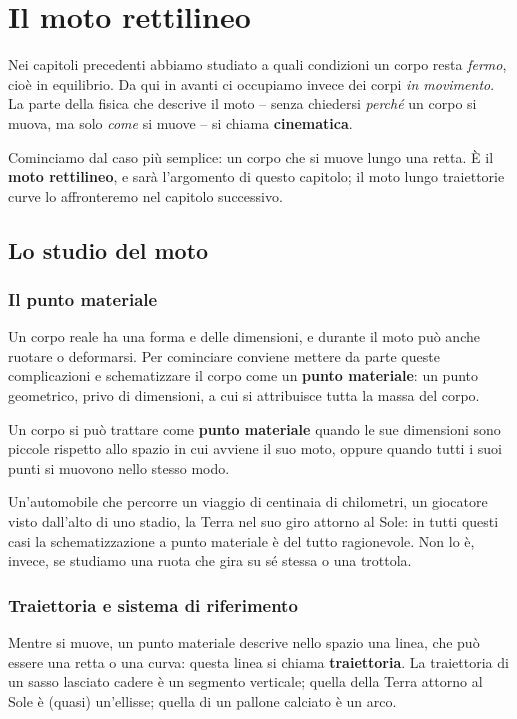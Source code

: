 \chapter{Il moto rettilineo}

Nei capitoli precedenti abbiamo studiato a quali condizioni un corpo resta \textit{fermo}, cioè in equilibrio. Da qui in avanti ci occupiamo invece dei corpi \textit{in movimento}. La parte della fisica che descrive il moto -- senza chiedersi \emph{perché} un corpo si muova, ma solo \emph{come} si muove -- si chiama \textbf{cinematica}.

Cominciamo dal caso più semplice: un corpo che si muove lungo una retta. È il \textbf{moto rettilineo}, e sarà l'argomento di questo capitolo; il moto lungo traiettorie curve lo affronteremo nel capitolo successivo.

\section{Lo studio del moto}

\subsection{Il punto materiale}
Un corpo reale ha una forma e delle dimensioni, e durante il moto può anche ruotare o deformarsi. Per cominciare conviene mettere da parte queste complicazioni e schematizzare il corpo come un \textbf{punto materiale}: un punto geometrico, privo di dimensioni, a cui si attribuisce tutta la massa del corpo.

\begin{definizione}
Un corpo si può trattare come \textbf{punto materiale} quando le sue dimensioni sono piccole rispetto allo spazio in cui avviene il suo moto, oppure quando tutti i suoi punti si muovono nello stesso modo.
\end{definizione}

Un'automobile che percorre un viaggio di centinaia di chilometri, un giocatore visto dall'alto di uno stadio, la Terra nel suo giro attorno al Sole: in tutti questi casi la schematizzazione a punto materiale è del tutto ragionevole. Non lo è, invece, se studiamo una ruota che gira su sé stessa o una trottola.

\subsection{Traiettoria e sistema di riferimento}
Mentre si muove, un punto materiale descrive nello spazio una linea, che può essere una retta o una curva: questa linea si chiama \textbf{traiettoria}. La traiettoria di un sasso lasciato cadere è un segmento verticale; quella della Terra attorno al Sole è (quasi) un'ellisse; quella di un pallone calciato è un arco.

